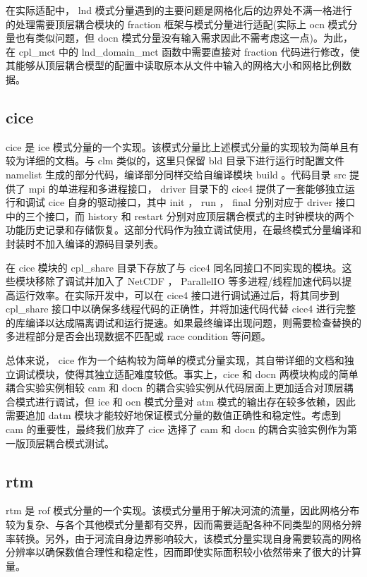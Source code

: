 在实际适配中， lnd 模式分量遇到的主要问题是网格化后的边界处不满一格进行的处理需要顶层耦合模块的 fraction 框架与模式分量进行适配(实际上 ocn 模式分量也有类似问题，但 docn 模式分量没有输入需求因此不需考虑这一点)。为此，在 cpl\_mct 中的 lnd\_domain\_mct 函数中需要直接对 fraction 代码进行修改，使其能够从顶层耦合模型的配置中读取原本从文件中输入的网格大小和网格比例数据。

\subsection{cice}

cice \cite{CICEdoc} \cite{CICEgithub} 是 ice 模式分量的一个实现。该模式分量比上述模式分量的实现较为简单且有较为详细的文档。与 clm 类似的，这里只保留 bld 目录下进行运行时配置文件 namelist 生成的部分代码，编译部分同样交给自编译模块 build 。代码目录 src 提供了 mpi 的单进程和多进程接口， driver 目录下的 cice4 提供了一套能够独立运行和调试 cice 自身的驱动接口，其中 init ， run ， final 分别对应于 driver 接口中的三个接口，而 history 和 restart 分别对应顶层耦合模式的主时钟模块的两个功能历史记录和存储恢复。这部分代码作为独立调试使用，在最终模式分量编译和封装时不加入编译的源码目录列表。

在 cice 模块的 cpl\_share 目录下存放了与 cice4 同名同接口不同实现的模块。这些模块移除了调试并加入了 NetCDF ， ParallelIO 等多进程/线程加速代码以提高运行效率。在实际开发中，可以在 cice4 接口进行调试通过后，将其同步到 cpl\_share 接口中以确保多线程代码的正确性，并将加速代码代替 cice4 进行完整的库编译以达成隔离调试和运行提速。如果最终编译出现问题，则需要检查替换的多进程部分是否会出现数据不匹配或 race condition 等问题。

总体来说， cice 作为一个结构较为简单的模式分量实现，其自带详细的文档和独立调试模块，使得其独立适配难度较低。事实上，cice 和 docn 两模块构成的简单耦合实验实例相较 cam 和 docn 的耦合实验实例从代码层面上更加适合对顶层耦合模式进行调试，但 ice 和 ocn 模式分量对 atm 模式的输出存在较多依赖，因此需要追加 datm 模块才能较好地保证模式分量的数值正确性和稳定性。考虑到 cam 的重要性，最终我们放弃了 cice 选择了 cam 和 docn 的耦合实验实例作为第一版顶层耦合模式测试。

\subsection{rtm}

rtm \cite{RTMdoc}是 rof 模式分量的一个实现。该模式分量用于解决河流的流量，因此网格分布较为复杂、与各个其他模式分量都有交界，因而需要适配各种不同类型的网格分辨率转换。另外，由于河流自身边界影响较大，该模式分量实现自身需要较高的网格分辨率以确保数值合理性和稳定性，因而即使实际面积较小依然带来了很大的计算量。

